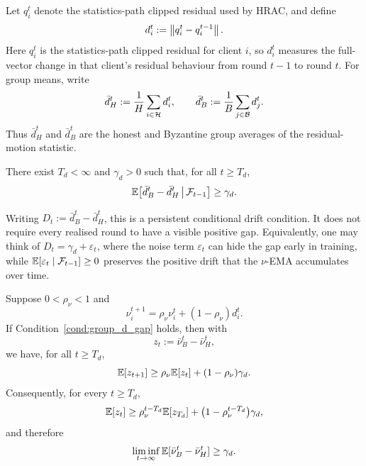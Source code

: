 Let \(q_i^t\) denote the statistics-path clipped residual used by HRAC, and
define
\begin{equation}
    d_i^t := \left\lVert q_i^t-q_i^{t-1} \right\rVert.
    \label{eq:diagonal_d_def}
\end{equation}
Here \(q_i^t\) is the statistics-path clipped residual for client \(i\), so
\(d_i^t\) measures the full-vector change in that client's residual behaviour
from round \(t-1\) to round \(t\). For group means, write
\begin{equation}
    \bar d_H^t := \frac1H\sum_{i\in\mathcal{H}}d_i^t,
    \qquad
    \bar d_B^t := \frac1B\sum_{j\in\mathcal{B}}d_j^t.
    \label{eq:group_d_means}
\end{equation}
Thus \(\bar d_H^t\) and \(\bar d_B^t\) are the honest and Byzantine group
averages of the residual-motion statistic.

\begin{condition}
\label{cond:group_d_gap}
There exist \(T_d<\infty\) and \(\gamma_d>0\) such that, for all \(t\ge T_d\),
\begin{equation}
    \mathbb{E}\!\left[
        \bar d_B^t-\bar d_H^t
        \,\middle|\,\mathcal{F}_{t-1}
    \right]
    \ge
    \gamma_d.
    \label{eq:group_d_gap_condition}
\end{equation}
\end{condition}

Writing \(D_t:=\bar d_B^t-\bar d_H^t\), this is a persistent conditional drift
condition. It does not require every realised round to have a visible positive
gap. Equivalently, one may think of \(D_t=\gamma_d+\varepsilon_t\), where the
noise term \(\varepsilon_t\) can hide the gap early in training, while
\(\mathbb{E}[\varepsilon_t\mid\mathcal{F}_{t-1}]\ge 0\) preserves the positive drift that the
\(\nu\)-EMA accumulates over time.

\begin{proposition}
\label{prop:d_gap_to_nu_gap}
Suppose \(0<\rho_\nu<1\) and
\begin{equation}
    \nu_i^{t+1}
    =
    \rho_\nu\nu_i^t+(1-\rho_\nu)d_i^t.
    \label{eq:nu_ema_for_d_gap}
\end{equation}
If Condition~\ref{cond:group_d_gap} holds, then with
\[
    z_t:=\bar\nu_B^t-\bar\nu_H^t,
\]
we have, for all \(t\ge T_d\),
\begin{equation}
    \mathbb{E}[z_{t+1}]
    \ge
    \rho_\nu\mathbb{E}[z_t]+(1-\rho_\nu)\gamma_d.
    \label{eq:expected_nu_gap_recursion}
\end{equation}
Consequently, for every \(t\ge T_d\),
\begin{equation}
    \mathbb{E}[z_t]
    \ge
    \rho_\nu^{t-T_d}\mathbb{E}[z_{T_d}]
    +
    \bigl(1-\rho_\nu^{t-T_d}\bigr)\gamma_d,
    \label{eq:expected_nu_gap_unrolled}
\end{equation}
and therefore
\begin{equation}
    \liminf_{t\to\infty}\mathbb{E}[\bar\nu_B^t-\bar\nu_H^t]
    \ge
    \gamma_d.
    \label{eq:expected_nu_gap_liminf}
\end{equation}
\end{proposition}


